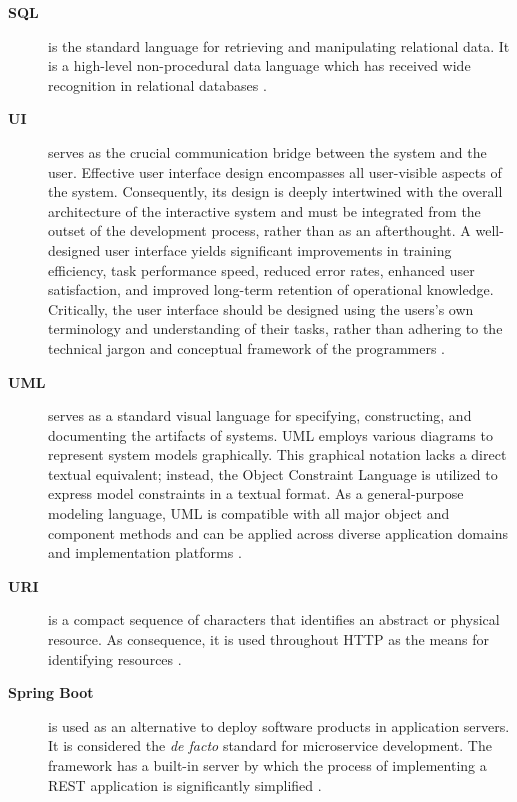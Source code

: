 \begin{description}
\item[\textbf{SQL}] is the standard language for retrieving and manipulating relational data.  It is a high-level non-procedural data language which has received wide recognition in relational databases \cite{blacher2022machine, kim1982optimizing}. 

\item[\textbf{UI}] serves as the crucial communication bridge between the system and the user. Effective user interface design encompasses all user-visible aspects of the system. Consequently, its design is deeply intertwined with the overall architecture of the interactive system and must be integrated from the outset of the development process, rather than as an afterthought. A well-designed user interface yields significant improvements in training efficiency, task performance speed, reduced error rates, enhanced user satisfaction, and improved long-term retention of operational knowledge. Critically, the user interface should be designed using the users's own terminology and understanding of their tasks, rather than adhering to the technical jargon and conceptual framework of the programmers \cite{jacob2003}.

\item[\textbf{UML}] serves as a standard visual language for specifying, constructing, and documenting the artifacts of systems. UML employs various diagrams to represent system models graphically. This graphical notation lacks a direct textual equivalent; instead, the Object Constraint Language is utilized to express model constraints in a textual format. As a general-purpose modeling language, UML is compatible with all major object and component methods and can be applied across diverse application domains and implementation platforms \cite{garcia2004uml, he2006comparison}.

\item[\textbf{URI}] is a compact sequence of characters that identifies an abstract or physical resource. As consequence, it is used throughout HTTP as the means for identifying resources \cite{rfc3986, rfc9110}.

\item[\textbf{Spring Boot}] is used as an alternative to deploy software products in application servers. It is considered the \textit{de facto} standard for microservice development. The framework has a built-in server by which the process of implementing a REST application is significantly simplified \cite{gomez2020crudyleaf}.

\end{description}